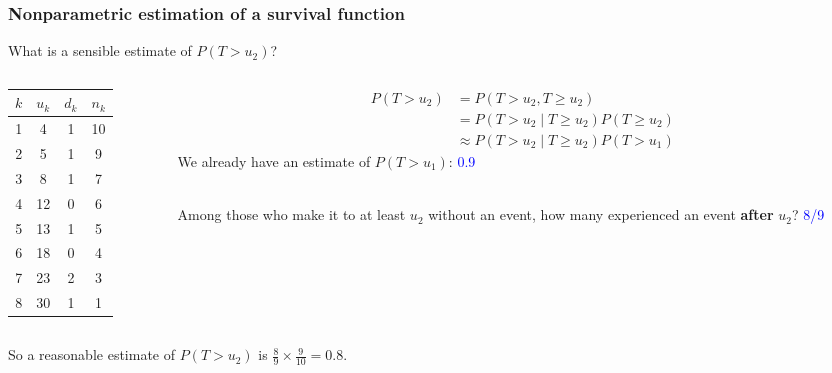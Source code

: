\documentclass[10pt,t]{beamer}
\begin{document}
\begin{frame}
	\frametitle{Nonparametric estimation of a survival function}
	What is a sensible estimate of $P(T > u_2)$?
	
	\begin{columns}
		\begin{column}{0.3\textwidth}
			\begin{center}
\begin{tabular}{|c|c|c|c|}
	\hline
	$k$ & $u_k$ & $d_k$ & $n_k$ \\
	\hline
	1 & 4 & 1 & 10 \\
	2& 5 & 1 & 9 \\
	3& 8 & 1 & 7 \\
	4&12 & 0 & 6 \\
	5&13 & 1 & 5 \\
	6&18 & 0 & 4 \\
	7&23 & 2 & 3 \\
	8&30 & 1 & 1 \\
	\hline
\end{tabular}
			\end{center}
		\end{column}
		\begin{column}{0.7\textwidth}  %
			\begin{align*}
				P(T > u_2) &= P(T > u_2, T\geq u_2) \\
				&= P(T > u_2 \mid T \geq u_2)P(T \geq u_2)\\
				&\approx P(T > u_2 \mid T \geq u_2)P(T > u_1)
			\end{align*}
			We already have an estimate of $P(T > u_1)$: \textcolor{blue}{0.9}\pause 
			\\ ~\ 
			
			Among those who make it to at least $u_2$ without an event, how many experienced an event \textbf{after} $u_2$? \pause \textcolor{blue}{8/9}
		\end{column}
	\end{columns}
	\vspace{0.5cm}
	So a reasonable estimate of $P(T > u_2)$ is $\frac{8}{9} \times \frac{9}{10} = 0.8$.
\end{frame}
\end{document}
